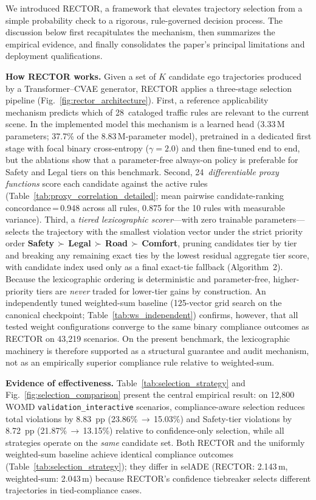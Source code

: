 We introduced \textsc{RECTOR}, a framework that elevates trajectory selection from a simple probability check to a rigorous, rule-governed decision process.  The discussion below first recapitulates the mechanism, then summarizes the empirical evidence, and finally consolidates the paper's principal limitations and deployment qualifications.

\textbf{How RECTOR works.}
Given a set of $K$ candidate ego trajectories produced by a Transformer--CVAE generator, RECTOR applies a three-stage selection pipeline (Fig.~\ref{fig:rector_architecture}).  First, a reference applicability mechanism predicts which of 28~cataloged traffic rules are relevant to the current scene.  In the implemented model this mechanism is a learned head (3.33\,M parameters; 37.7\% of the 8.83\,M-parameter model), pretrained in a dedicated first stage with focal binary cross-entropy ($\gamma{=}2.0$) and then fine-tuned end to end, but the ablations show that a parameter-free always-on policy is preferable for Safety and Legal tiers on this benchmark.  Second, 24~\emph{differentiable proxy functions} score each candidate against the active rules (Table~\ref{tab:proxy_correlation_detailed}; mean pairwise candidate-ranking concordance\,=\,0.948 across all rules, 0.875 for the 10 rules with measurable variance).  Third, a \emph{tiered lexicographic scorer}---with zero trainable parameters---selects the trajectory with the smallest violation vector under the strict priority order \textbf{Safety\,$\succ$\,Legal\,$\succ$\,Road\,$\succ$\,Comfort}, pruning candidates tier by tier and breaking any remaining exact ties by the lowest residual aggregate tier score, with candidate index used only as a final exact-tie fallback (Algorithm~2).  Because the lexicographic ordering is deterministic and parameter-free, higher-priority tiers are \emph{never} traded for lower-tier gains by construction.  An independently tuned weighted-sum baseline (125-vector grid search on the canonical checkpoint; Table~\ref{tab:ws_independent}) confirms, however, that all tested weight configurations converge to the same binary compliance outcomes as RECTOR on 43{,}219 scenarios.  On the present benchmark, the lexicographic machinery is therefore supported as a structural guarantee and audit mechanism, not as an empirically superior compliance rule relative to weighted-sum.

\textbf{Evidence of effectiveness.}
Table~\ref{tab:selection_strategy} and Fig.~\ref{fig:selection_comparison} present the central empirical result: on 12{,}800 WOMD \texttt{validation\_interactive} scenarios, compliance-aware selection reduces total violations by 8.83~pp (23.86\%\,$\to$\,15.03\%) and Safety-tier violations by 8.72~pp (21.87\%\,$\to$\,13.15\%) relative to confidence-only selection, while all strategies operate on the \emph{same} candidate set.  Both RECTOR and the uniformly weighted-sum baseline achieve identical compliance outcomes (Table~\ref{tab:selection_strategy}); they differ in selADE (RECTOR: 2.143\,m, weighted-sum: 2.043\,m) because RECTOR's confidence tiebreaker selects different trajectories in tied-compliance cases.

